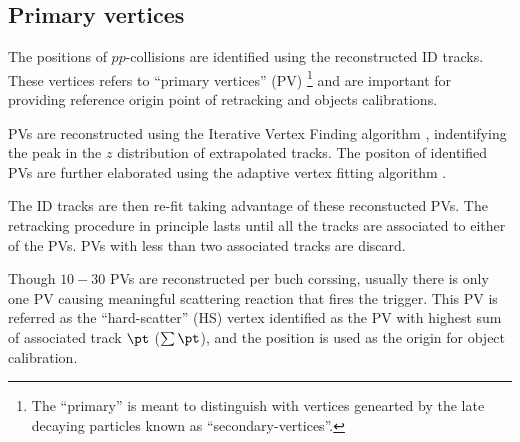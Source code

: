 \subsection{Primary vertices} \label{sec::objDef::PV}
The positions of $pp$-collisions are identified using the reconstructed ID tracks. These vertices refers to ``primary vertices'' (PV) 
\footnote{The ``primary'' is meant to distinguish with vertices genearted by the late decaying particles known as ``secondary-vertices''.}
and are important for providing reference origin point of retracking and objects calibrations.

PVs are reconstructed using the Iterative Vertex Finding algorithm \cite{134_vertexing_Run1}\cite{135_vertexing_Run1_2012}, indentifying the peak in the $z$ distribution of extrapolated tracks. The positon of identified PVs are further elaborated using the adaptive vertex fitting algorithm \cite{136_adaVertexFit}.

The ID tracks are then re-fit taking advantage of these reconstucted PVs. The retracking procedure in principle lasts until all the tracks are associated to either of the PVs. PVs with less than two associated tracks are discard. 

Though $10-30$ PVs are reconstructed per buch corssing, usually there is only one PV causing meaningful scattering reaction that fires the trigger. This PV is referred as the ``hard-scatter'' (HS) vertex  identified as the PV with highest sum of associated track $\pt$ ($\sum\pt$), and the position is used as the origin for object calibration. \\






